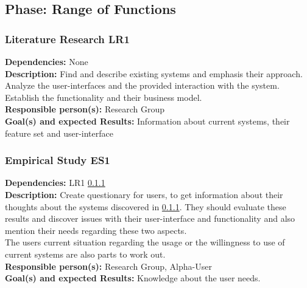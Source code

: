 \documentclass[a4paper,11pt]{article}
\providecommand*{\note}[1]{\small \textcolor{RoyalBlue}{\begin{minipage}{\textwidth}{#1}\end{minipage}}}
\begin{document}

\subsection{Phase: Range of Functions}
\label{sect:workplan:rangeoffucntions}

\subsubsection{Literature Research LR1}
\label{sect:workplan:phase1:lr1}
\textbf{Dependencies:} None\\
\textbf{Description:} Find and describe existing systems and emphasis their approach.
Analyze the user-interfaces and the provided interaction with the system. Establish the functionality and their business model.\\
\textbf{Responsible person(s):} Research Group\\
\textbf{Goal(s) and expected Results:} Information about current systems, their feature set and user-interface\\

\subsubsection{Empirical Study ES1}
\label{sect:workplan:phase1:es1}
\textbf{Dependencies:} LR1 \ref{sect:workplan:phase1:lr1}\\
\textbf{Description:} Create questionary for users, to get information about their thoughts about the systems discovered in \ref{sect:workplan:phase1:lr1}. They should evaluate these results and discover issues with their user-interface and functionality and also mention their needs regarding these two aspects.\\
The users current situation regarding the usage or the willingness to use of current systems are also parts to work out. \\
\textbf{Responsible person(s):} Research Group, Alpha-User \\
\textbf{Goal(s) and expected Results:} Knowledge about the user needs.\\
\end{document}
